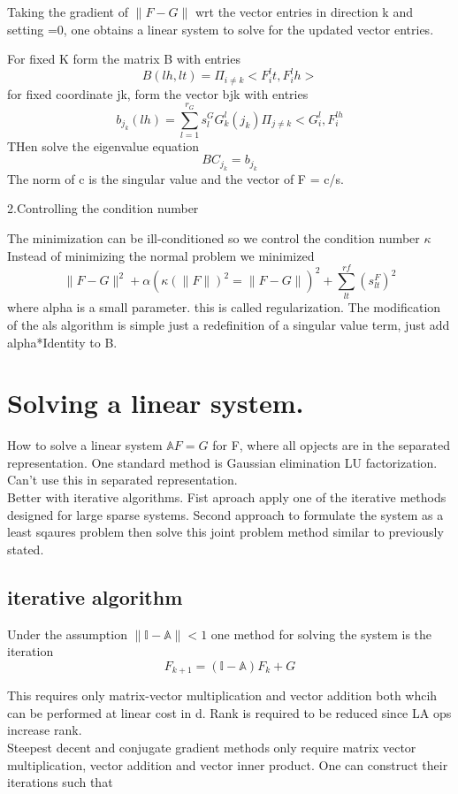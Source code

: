 \documentclass[10pt, draft]{article}
\begin{document}
 Taking the gradient of $\|F-G\|$ wrt the vector entries in direction k and setting =0, one obtains a linear system to solve for the updated vector entries.\linebreak
 
 For fixed K form the matrix B with entries 
 \[B(lh, lt) = \Pi_{i\neq k} <F_i^lt, F_i^lh> \]
 for fixed coordinate jk, form the vector bjk with entries 
 \[b_{j_k}(lh) = \sum_{l=1}^{r_G} s_l^G G_k^l(j_k) \Pi_{j \neq k} <G_i^l, F_i^{lh}\]
 THen solve the eigenvalue equation
\[B C_{j_k} = b_{j_k}\]
The norm of c is the singular value and the vector of F = c/s.  \linebreak[1]

2.Controlling the condition number \linebreak[1]

The minimization can be ill-conditioned so we control the condition number $\kappa$ Instead of minimizing the normal problem we minimized 
\[\|F-G\|^2 + \alpha (\kappa (\|F\|)^2 = \|F-G\|)^2 + \sum _{lt}^{rf}(s_{lt}^F)^2\]
where alpha is a small parameter.  this is called regularization.  The modification of the als algorithm is simple just a redefinition of a singular value term, just add alpha*Identity to B.  

\section{ Solving a linear system.}

How to solve a linear system $\mathbb{A}F = G$ for F, where all opjects are in the separated representation.  One standard method is Gaussian elimination LU factorization.  Can't use this in separated representation.  \\
Better with iterative algorithms.  Fist aproach apply one of the iterative methods designed for large sparse systems.  Second approach to formulate the system as a least sqaures problem then solve this joint problem method similar to previously stated.  
\subsection{iterative algorithm}

Under the assumption $\|\mathbb{I} - \mathbb{A}\| < 1$ one method for solving the system is the iteration 
\[F_{k+1} = (\mathbb{I} -\mathbb{A})F_k +G\]
 
 This requires only matrix-vector multiplication and vector addition both whcih can be performed at linear cost in d.  Rank is required to be reduced since LA ops increase rank.  \\
 Steepest decent and conjugate gradient methods only require matrix vector multiplication, vector addition and vector inner product. One can construct their iterations such that 
 
\end{document}

